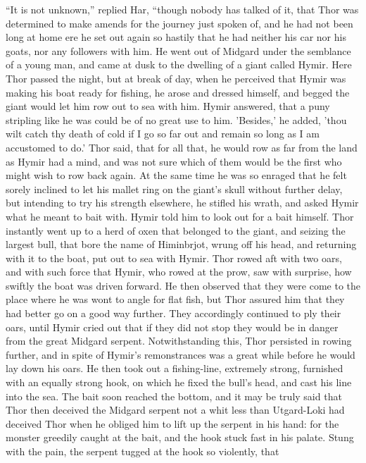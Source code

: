 ``It is not unknown,'' replied Har, ``though nobody has talked of it,
that Thor was determined to make amends for the journey just spoken
of, and he had not been long at home ere he set out again so hastily
that he had neither his car nor his goats, nor any followers with him.
He went out of Midgard under the semblance of a young man, and came at
dusk to the dwelling of a giant called Hymir. Here Thor passed the
night, but at break of day, when he perceived that Hymir was making
his boat ready for fishing, he arose and dressed himself, and begged
the giant would let him row out to sea with him. Hymir answered, that
a puny stripling like he was could be of no great use to him.
'Besides,' he added, 'thou wilt catch thy death of cold if I go so far
out and remain so long as I am accustomed to do.' Thor said, that for
all that, he would row as far from the land as Hymir had a mind, and
was not sure which of them would be the first who might wish to row
back again. At the same time he was so enraged that he felt sorely
inclined to let his mallet ring on the giant's skull without further
delay, but intending to try his strength elsewhere, he stifled his
wrath, and asked Hymir what he meant to bait with. Hymir told him to
look out for a bait himself. Thor instantly went up to a herd of oxen
that belonged to the giant, and seizing the largest bull, that bore
the name of Himinbrjot, wrung off his head, and returning with it to
the boat, put out to sea with Hymir. Thor rowed aft with two oars, and
with such force that Hymir, who rowed at the prow, saw with surprise,
how swiftly the boat was driven forward. He then observed that they
were come to the place where he was wont to angle for flat fish, but
Thor assured him that they had better go on a good way further. They
accordingly continued to ply their oars, until Hymir cried out that if
they did not stop they would be in danger from the great Midgard
serpent. Notwithstanding this, Thor persisted in rowing further, and
in spite of Hymir's remonstrances was a great while before he would
lay down his oars. He then took out a fishing-line, extremely strong,
furnished with an equally strong hook, on which he fixed the bull's
head, and cast his line into the sea. The bait soon reached the
bottom, and it may be truly said that Thor then deceived the Midgard
serpent not a whit less than Utgard-Loki had deceived Thor when he
obliged him to lift up the serpent in his hand: for the monster
greedily caught at the bait, and the hook stuck fast in his palate.
Stung with the pain, the serpent tugged at the hook so violently, that
